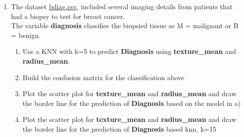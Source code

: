 \documentclass[
]{book}
\begin{document}
\begin{enumerate}
\def\labelenumi{\arabic{enumi})}
\item
  The dataset \href{https://www.dropbox.com/s/fvj7774lmyneab6/bdiag.csv?dl=1}{bdiag.csv},
  included several imaging details from patients that had a biopsy to test for
  breast cancer.\\
  The variable \textbf{diagnosis} classifies the biopsied tissue as M = malignant or
  B = benign.

  \begin{enumerate}
  \def\labelenumii{\alph{enumii})}
  \item
    Use a KNN with k=5 to predict \textbf{Diagnosis} using \textbf{texture\_mean}
    and \textbf{radius\_mean}.
  \item
    Build the confusion matrix for the classification above
  \item
    Plot the scatter plot for \textbf{texture\_mean}
    and \textbf{radius\_mean} and draw the border line for the prediction of
    \textbf{Diagnosis} based on the model in a)
  \item
    Plot the scatter plot for \textbf{texture\_mean}
    and \textbf{radius\_mean} and draw the border line for the prediction of
    \textbf{Diagnosis} based knn, k=15
  \end{enumerate}
\end{enumerate}
\end{document}
